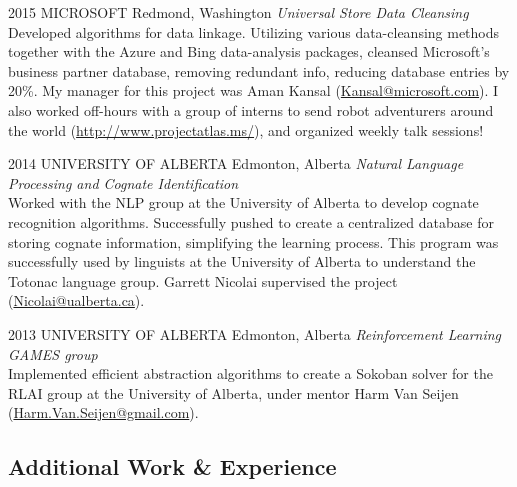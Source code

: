 \documentclass{friggeri-cv} %
\begin{document}
\begin{entrylist}


\entry
{2015}
{MICROSOFT}
{Redmond, Washington}
{\emph{Universal Store Data Cleansing} \\
Developed algorithms for data linkage. Utilizing various data-cleansing methods together with the Azure and Bing data-analysis packages, cleansed Microsoft's business partner database, removing redundant info, reducing database entries by 20\%. My manager for this project was Aman Kansal (\href{mailto:Kansal@microsoft.com}{Kansal@microsoft.com}). I also worked off-hours with a group of interns to send robot adventurers around the world (\href{http://www.projectatlas.ms/}{http://www.projectatlas.ms/}), and organized weekly talk sessions!}


\entry
{2014}
{UNIVERSITY OF ALBERTA}
{Edmonton, Alberta}
{\emph{Natural Language Processing and Cognate Identification} \\
Worked with the NLP group at the University of Alberta to develop cognate recognition algorithms. Successfully pushed to create a centralized database for storing cognate information, simplifying the learning process. This program was successfully used by linguists at the University of Alberta to understand the Totonac language group. Garrett Nicolai supervised the project (\href{mailto:Nicolai@ualberta.ca}{Nicolai@ualberta.ca}).}


\entry
{2013}
{UNIVERSITY OF ALBERTA}
{Edmonton, Alberta}
{\emph{Reinforcement Learning GAMES group} \\
Implemented efficient abstraction algorithms to create a Sokoban solver for the RLAI group at the University of Alberta, under mentor Harm Van Seijen (\href{mailto:Harm.Van.Seijen@gmail.com}{Harm.Van.Seijen@gmail.com}).}


\end{entrylist}

\subsection{Additional Work \& Experience}
\end{document}
